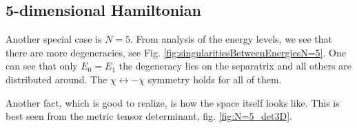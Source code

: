 




\subsection{5-dimensional Hamiltonian}

Another special case is $N=5$. From analysis of the energy levels, we see that there are more degeneracies, see Fig. \ref{fig:singularitiesBetweenEnergiesN=5}. One can see that only $E_0=E_1$ the degeneracy lies on the separatrix and all others are distributed around. The $\chi\leftrightarrow-\chi$ symmetry holds for all of them. 

Another fact, which is good to realize, is how the space itself looks like. This is best seen from the metric tensor determinant, fig. \ref{fig:N=5_det3D}.




